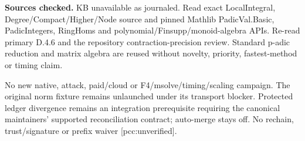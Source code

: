 \documentclass[10pt]{article}
\begin{document}
\textbf{Sources checked.} KB unavailable as journaled. Read exact LocalIntegral,
Degree/Compact/Higher/Node source and pinned Mathlib PadicVal.Basic,
PadicIntegers, RingHoms and polynomial/Finsupp/monoid-algebra APIs. Re-read
primary D.4.6 and the repository contraction-precision review. Standard
p-adic reduction and matrix algebra are reused without novelty, priority,
fastest-method or timing claim.

No new native, attack, paid/cloud or F4/msolve/timing/scaling campaign.
The original norm fixture remains unlaunched under its transport blocker.
Protected ledger divergence remains an integration prerequisite requiring
the canonical maintainers' supported reconciliation contract; auto-merge
stays off. No rechain, trust/signature or prefix waiver [pcc:unverified].
\end{document}
